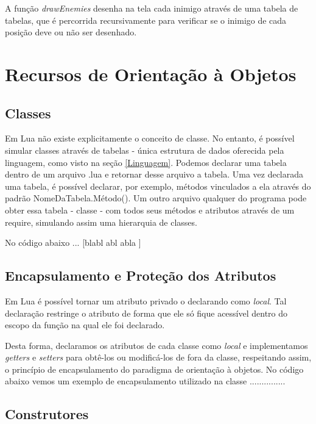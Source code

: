 \documentclass[rel_mlp]{iiufrgs}
\begin{document}
A função \textit{drawEnemies} desenha na tela cada inimigo através de uma tabela de tabelas, que é percorrida recursivamente para verificar se o inimigo de cada posição deve ou não ser desenhado.


\chapter{Recursos de Orientação à Objetos}

\section{Classes} \label{Classes}
	
Em Lua não existe explicitamente o conceito de classe. No entanto, é possível simular classes através de tabelas - única estrutura de dados oferecida pela linguagem, como visto na seção \ref{Linguagem}. Podemos declarar uma tabela dentro de um arquivo .lua e retornar desse arquivo a tabela. Uma vez declarada uma tabela, é possível declarar, por exemplo, métodos vinculados a ela através do padrão NomeDaTabela.Método(). Um outro arquivo qualquer do programa pode obter essa tabela - classe - com todos seus métodos e atributos através de um require, simulando assim uma hierarquia de classes.

No código abaixo ... [blabl abl abla ]


\section{Encapsulamento e Proteção dos Atributos}

Em Lua é possível tornar um atributo privado o declarando como \textit{local}. Tal declaração restringe o atributo de forma que ele só fique acessível dentro do escopo da função na qual ele foi declarado.

Desta forma, declaramos os atributos de cada classe como \textit{local} e implementamos \textit{getters} e \textit{setters} para obtê-los ou modificá-los de fora da classe, respeitando assim, o princípio de encapsulamento do paradigma de orientação à objetos. No código abaixo vemos um exemplo de encapsulamento utilizado na classe ...............



\section{Construtores} \label{Construtores}
\end{document}
